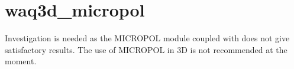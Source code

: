\chapter{waq3d\_micropol}
%
Investigation is needed as the MICROPOL module coupled with  does not give satisfactory results.
The use of MICROPOL in 3D is not recommended at the moment.
